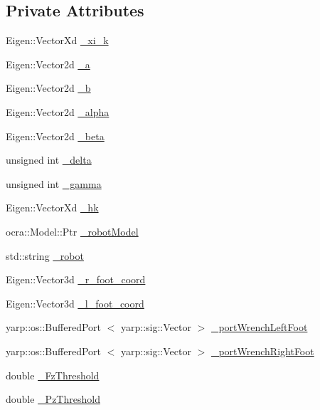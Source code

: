 \subsection*{\-Private \-Attributes}
\begin{DoxyCompactItemize}
\item 
\-Eigen\-::\-Vector\-Xd \hyperlink{classMIQP_1_1MIQPState_aee08863bacb44f7c667cbd566fa6ddcf}{\-\_\-xi\-\_\-k}
\item 
\-Eigen\-::\-Vector2d \hyperlink{classMIQP_1_1MIQPState_a6717fedc0f49df4f60ecb6b97955da1e}{\-\_\-a}
\item 
\-Eigen\-::\-Vector2d \hyperlink{classMIQP_1_1MIQPState_aafa5bce9860b191257cb0166c217e9a3}{\-\_\-b}
\item 
\-Eigen\-::\-Vector2d \hyperlink{classMIQP_1_1MIQPState_a584ef13e157d3a34333d4f990363abc7}{\-\_\-alpha}
\item 
\-Eigen\-::\-Vector2d \hyperlink{classMIQP_1_1MIQPState_ad5f8f3e9a18a29810b4347540ddf7c82}{\-\_\-beta}
\item 
unsigned int \hyperlink{classMIQP_1_1MIQPState_a5083cb38c427382e4d788e7d6b0aab79}{\-\_\-delta}
\item 
unsigned int \hyperlink{classMIQP_1_1MIQPState_ab82daf9a470a885186cb733c4d4a72f8}{\-\_\-gamma}
\item 
\-Eigen\-::\-Vector\-Xd \hyperlink{classMIQP_1_1MIQPState_a1fa7e57c280b3cf451275fb9c617182b}{\-\_\-hk}
\item 
ocra\-::\-Model\-::\-Ptr \hyperlink{classMIQP_1_1MIQPState_ab4a5a930c7db84035376864938d8a170}{\-\_\-robot\-Model}
\item 
std\-::string \hyperlink{classMIQP_1_1MIQPState_ad27b574f93e1b163ff9b01939bd00de3}{\-\_\-robot}
\item 
\-Eigen\-::\-Vector3d \hyperlink{classMIQP_1_1MIQPState_a20ef40fafe48e0c80d52ef4da89e95b7}{\-\_\-r\-\_\-foot\-\_\-coord}
\item 
\-Eigen\-::\-Vector3d \hyperlink{classMIQP_1_1MIQPState_a3027b3e93ce4c18f184c52438bed6e6a}{\-\_\-l\-\_\-foot\-\_\-coord}
\item 
yarp\-::os\-::\-Buffered\-Port\*
$<$ yarp\-::sig\-::\-Vector $>$ \hyperlink{classMIQP_1_1MIQPState_ab00569102a1cf95cb2afbd3b1d9a95cb}{\-\_\-port\-Wrench\-Left\-Foot}
\item 
yarp\-::os\-::\-Buffered\-Port\*
$<$ yarp\-::sig\-::\-Vector $>$ \hyperlink{classMIQP_1_1MIQPState_a2007f089d28885858db8fb470469ef37}{\-\_\-port\-Wrench\-Right\-Foot}
\item 
double \hyperlink{classMIQP_1_1MIQPState_a9eb5039dd699292c419f39514965e359}{\-\_\-\-Fz\-Threshold}
\item 
double \hyperlink{classMIQP_1_1MIQPState_aee7955c37422c6aa4cd115616feb4ea9}{\-\_\-\-Pz\-Threshold}
\end{DoxyCompactItemize}
